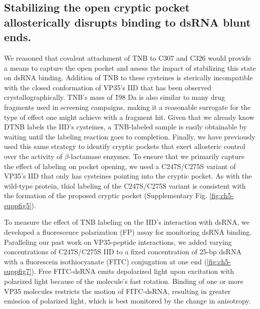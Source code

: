 \documentclass[../main.tex]{subfiles}
\begin{document}
    \subsection{Stabilizing the open cryptic pocket allosterically disrupts binding to dsRNA blunt ends.}
        We reasoned that covalent attachment of TNB to C307 and C326 would provide a means to capture the open pocket and assess the impact of stabilizing this state on dsRNA binding. Addition of TNB to these cysteines is sterically incompatible with the closed conformation of VP35’s IID that has been observed crystallographically. TNB’s mass of \~198 Da is also similar to many drug fragments used in screening campaigns, making it a reasonable surrogate for the type of effect one might achieve with a fragment hit. Given that we already know DTNB labels the IID’s cysteines, a TNB-labeled sample is easily obtainable by waiting until the labeling reaction goes to completion. Finally, we have previously used this same strategy to identify cryptic pockets that exert allosteric control over the activity of $\beta$-lactamase enzymes\cite{Porter:2019hv,Bowman:2015dh}. To ensure that we primarily capture the effect of labeling on pocket opening, we used a C247S/C275S variant of VP35’s IID that only has cysteines pointing into the cryptic pocket. As with the wild-type protein, thiol labeling of the C247S/C275S variant is consistent with the formation of the proposed cryptic pocket (Supplementary Fig. \ref{fig:ch5-suppfig5}).

        To measure the effect of TNB labeling on the IID’s interaction with dsRNA, we developed a fluorescence polarization (FP) assay for monitoring dsRNA binding. Paralleling our past work on VP35-peptide interactions\cite{liu_sensitive_2017}, we added varying concentrations of C247S/C275S IID to a fixed concentration of 25-bp dsRNA with a fluorescein isothiocyanate (FITC) conjugation at one end (\ref{fig:ch5-suppfig7}). Free FITC-dsRNA emits depolarized light upon excitation with polarized light because of the molecule’s fast rotation. Binding of one or more VP35 molecules restricts the motion of FITC-dsRNA, resulting in greater emission of polarized light, which is best monitored by the change in anisotropy\cite{keck_ssbdna_2012}.
\end{document}
